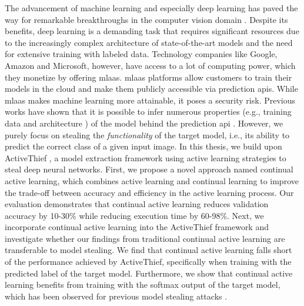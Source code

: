 \Abstract
The advancement of machine learning and especially deep learning has paved the way for remarkable breakthroughs in the computer vision domain 
\parencite*{goodfellow2020generative,he2016deep,lecun1989backpropagation}. Despite its benefits, deep learning is a demanding task that requires
significant resources due to the increasingly complex architecture of state-of-the-art models and the need for extensive training with labeled data.
Technology companies like Google, Amazon and Microsoft, however, have access to a lot of computing power, which they monetize by offering \gls{mlaas}.
\gls{mlaas} platforms allow customers to train their models in the cloud and make them publicly accessible via prediction \glspl{api}. 
While \gls{mlaas} makes machine learning more attainable, it poses a security risk. Previous works have shown that it is possible to infer numerous
properties (e.g., training data \cite{shokri2017membership} and architecture \cite{oh2019towards}) of the model behind the prediction \gls{api}
\parencite{papernot2017practical,tramer2016stealing}.
However, we purely focus on stealing the \textit{functionality} of the target model, i.e., its ability to predict the correct class of a given input image.
In this thesis, we build upon ActiveThief \cite{pal2020activethief}, a model extraction framework using active learning strategies to steal deep neural networks. 
First, we propose a novel approach named continual active learning, which combines active learning and continual learning to improve the trade-off between
accuracy and efficiency in the active learning process. Our evaluation demonstrates that continual active learning reduces validation accuracy by 10-30\%
while reducing execution time by 60-98\%. Next, we incorporate continual active learning into the ActiveThief framework and investigate whether our findings
from traditional continual active learning are transferable to model stealing. We find that continual active learning falls short of the performance achieved by ActiveThief,
specifically when training with the predicted label of the target model. Furthermore, we show that continual active learning benefits from training with the softmax
output of the target model, which has been observed for previous model stealing attacks \parencite{pal2020activethief,orekondy2019knockoff}.
